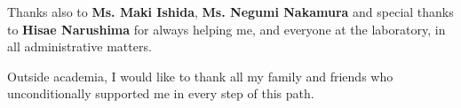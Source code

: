 Thanks also to \textbf{Ms. Maki Ishida}, \textbf{Ms. Negumi Nakamura} and special thanks to \textbf{Hisae Narushima} for always helping me, and everyone at the laboratory, in all administrative matters. 

Outside academia, I would like to thank all my family and friends who unconditionally supported me in every step of this path.

%
%
%





